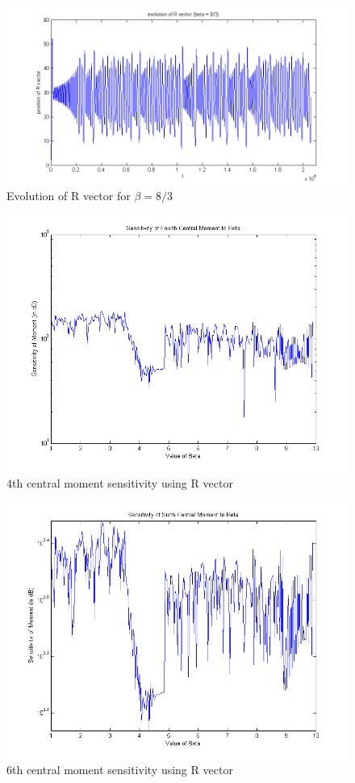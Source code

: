 \documentclass{article}[11pt]
\begin{document}
\begin{figure}[H]
\centering
\includegraphics[scale = 0.6]{images/REvolution.png}
\caption{Evolution of R vector for $\beta = 8/3$}
\label{fig:REvolution}
\end{figure}
\begin{figure}[H]
\centering
\includegraphics[scale = 0.6]{images/RSensitivityFourth.png}
\caption{4th central moment sensitivity using R vector}
\label{fig:4thR}
\end{figure}
\begin{figure}[H]
\centering
\includegraphics[scale = 0.6]{images/RSensitivitySixth.png}
\caption{6th central moment sensitivity using R vector}
\label{fig:6thR}
\end{figure}
\end{document}
